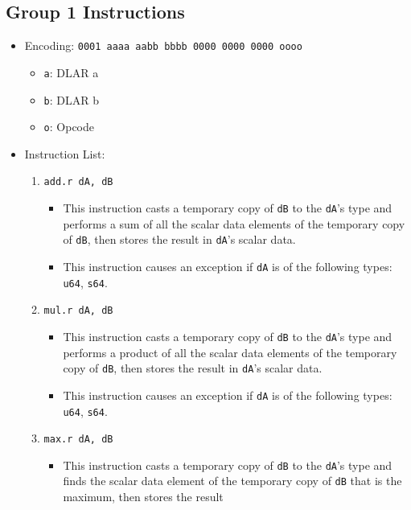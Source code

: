\documentclass{article}
\begin{document}
	\subsection{Group 1 Instructions}
		\begin{itemize}
		\item Encoding: \texttt{0001 aaaa aabb bbbb  0000 0000 0000 oooo}
			\begin{itemize}
			\item \texttt{a}: DLAR a
			\item \texttt{b}: DLAR b
			\item \texttt{o}: Opcode
			\end{itemize}

		\item Instruction List:
			\begin{enumerate}
			\item \texttt{add.r dA, dB}
				\begin{itemize}
				\item This instruction casts a temporary copy of
					\texttt{dB} to the \texttt{dA}'s type and performs a
					sum of all the scalar data elements of the temporary
					copy of \texttt{dB}, then stores the result in
					\texttt{dA}'s scalar data.
				\item This instruction causes an exception if \texttt{dA}
					is of the following types: \texttt{u64}, \texttt{s64}.
				\end{itemize}
			\item \texttt{mul.r dA, dB}
				\begin{itemize}
				\item This instruction casts a temporary copy of
					\texttt{dB} to the \texttt{dA}'s type and performs a
					product of all the scalar data elements of the
					temporary copy of \texttt{dB}, then stores the result
					in \texttt{dA}'s scalar data.
				\item This instruction causes an exception if \texttt{dA}
					is of the following types: \texttt{u64}, \texttt{s64}.
				\end{itemize}
			\item \texttt{max.r dA, dB}
				\begin{itemize}
				\item This instruction casts a temporary copy of
					\texttt{dB} to the \texttt{dA}'s type and finds the
					scalar data element of the temporary copy of
					\texttt{dB} that is the maximum, then stores the result

\end{itemize}
\end{enumerate}
\end{itemize}
\end{document}

